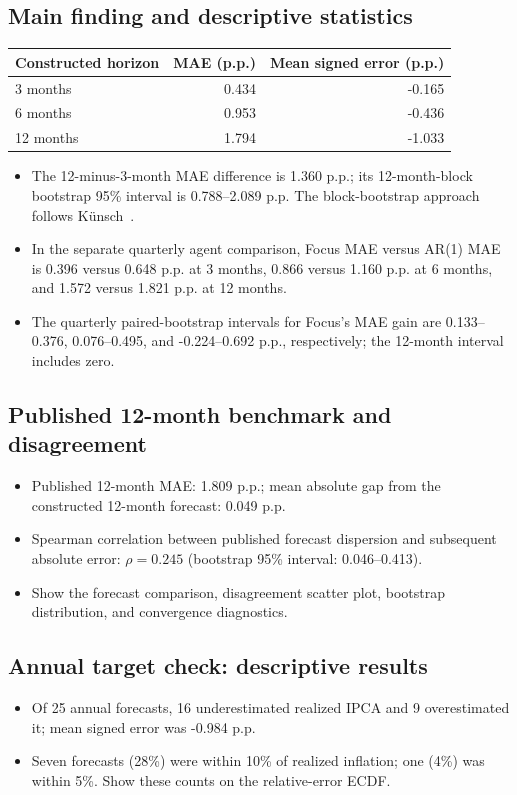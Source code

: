 \documentclass[11pt,a4paper]{article}
\begin{document}
\subsection{Main finding and descriptive statistics}
\begin{center}
\begin{tabular}{lrr}
\hline
Constructed horizon & MAE (p.p.) & Mean signed error (p.p.) \\
\hline
3 months  & 0.434 & -0.165 \\
6 months  & 0.953 & -0.436 \\
12 months & 1.794 & -1.033 \\
\hline
\end{tabular}
\end{center}
\begin{itemize}
  \item The 12-minus-3-month MAE difference is 1.360 p.p.; its 12-month-block bootstrap 95\% interval is 0.788--2.089 p.p. The block-bootstrap approach follows K\"unsch~\cite{kunsch1989}.
  \item In the separate quarterly agent comparison, Focus MAE versus AR(1) MAE is 0.396 versus 0.648 p.p. at 3 months, 0.866 versus 1.160 p.p. at 6 months, and 1.572 versus 1.821 p.p. at 12 months.
  \item The quarterly paired-bootstrap intervals for Focus's MAE gain are 0.133--0.376, 0.076--0.495, and -0.224--0.692 p.p., respectively; the 12-month interval includes zero.
\end{itemize}

\subsection{Published 12-month benchmark and disagreement}
\begin{itemize}
  \item Published 12-month MAE: 1.809 p.p.; mean absolute gap from the constructed 12-month forecast: 0.049 p.p.
  \item Spearman correlation between published forecast dispersion and subsequent absolute error: $\rho=0.245$ (bootstrap 95\% interval: 0.046--0.413).
  \item Show the forecast comparison, disagreement scatter plot, bootstrap distribution, and convergence diagnostics.
\end{itemize}

\subsection{Annual target check: descriptive results}
\begin{itemize}
  \item Of 25 annual forecasts, 16 underestimated realized IPCA and 9 overestimated it; mean signed error was -0.984 p.p.
  \item Seven forecasts (28\%) were within 10\% of realized inflation; one (4\%) was within 5\%. Show these counts on the relative-error ECDF.
\end{itemize}
\end{document}
